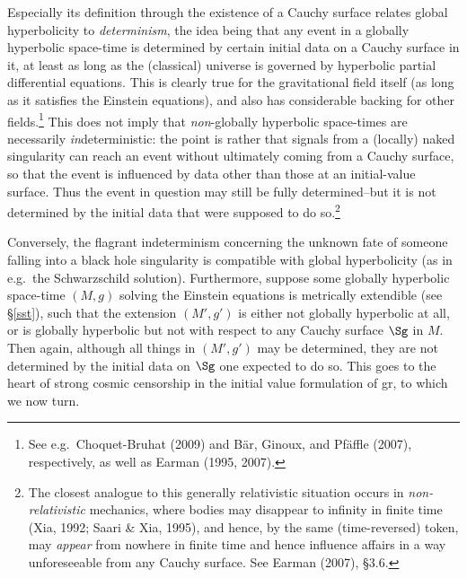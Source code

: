 \documentclass[12pt]{article}
\newcommand{\GR}{{\sc gr}}
\begin{document}
Especially its definition through the existence of a Cauchy surface relates global hyperbolicity to \emph{determinism}, the idea being that any event in a globally hyperbolic space-time is determined by certain initial data on a Cauchy surface in it, at least as long as the (classical) universe is governed by hyperbolic partial differential equations. This is clearly true for the gravitational field itself (as long as it satisfies the Einstein equations), and also has considerable backing for other fields.\footnote{See e.g.\  Choquet-Bruhat (2009) and B\"{a}r, Ginoux, and Pf\"{a}ffle (2007), respectively, as well as Earman (1995, 2007).}
This does not imply that \emph{non}-globally hyperbolic space-times are necessarily \emph{in}deterministic:  the point is rather that signals from a (locally) naked singularity can reach an event without ultimately coming from a 
Cauchy surface, so that the event is influenced by data other than those at an initial-value surface. Thus the event in question may still be fully determined--but it is not determined by the initial data that were supposed to do so.\footnote{
The closest analogue to this generally relativistic situation occurs in \emph{non-relativistic} mechanics, where bodies may disappear to infinity in finite time (Xia, 1992; Saari \& Xia, 1995), and hence, by the same (time-reversed) token, may \emph{appear} from nowhere in finite time and hence influence affairs in a way unforeseeable from any Cauchy surface.
See Earman (2007), \S 3.6.}

Conversely,  the flagrant indeterminism concerning the unknown fate of someone falling into a black hole singularity is compatible with global hyperbolicity (as in e.g.\ the Schwarzschild solution). Furthermore, suppose some globally hyperbolic space-time $(M,g)$ solving the Einstein equations is metrically extendible (see \S\ref{sst}), such that the extension $(M',g')$  is either not globally hyperbolic at all, or is  globally hyperbolic but not with respect to any Cauchy surface $\Sg$ in $M$. Then again, although all things in $(M',g')$ may be determined, they are not determined by the initial data on $\Sg$ one expected to do so. This goes to the heart of strong cosmic censorship in the initial value formulation of \GR, to which we now turn. 
\end{document}
